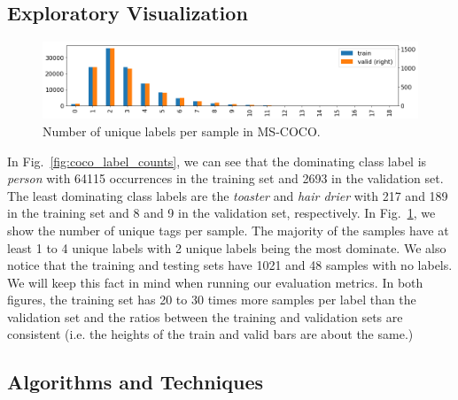 \documentclass[12pt,journal,compsoc]{IEEEtran}
\begin{document}
\subsection{Exploratory Visualization}


\begin{figure}[!t]
\normalsize
\includegraphics[width=\linewidth]{mscoco_n_images_with_k_tags.png}
\caption{Number of unique labels per sample in MS-COCO.}
\label{fig:coco_n_images_with_k_tags}
\vspace*{4pt}
\end{figure}

In Fig.~\ref{fig:coco_label_counts}, we can see that the dominating class label is \textit{person} with 64115 occurrences in the training set and 2693 in the validation set. The least dominating class labels are the \textit{toaster} and \textit{hair drier} with 217 and 189 in the training set and 8 and 9 in the validation set, respectively.
In Fig.~\ref{fig:coco_n_images_with_k_tags}, we show the number of unique tags per sample. The majority of the samples have at least 1 to 4 unique labels with 2 unique labels being the most dominate. We also notice that the training and testing sets have 1021 and 48 samples with no labels. We will keep this fact in mind when running our evaluation metrics.
In both figures, the training set has 20 to 30 times more samples per label than the validation set and the ratios between the training and validation sets are consistent (i.e. the heights of the train and valid bars are about the same.)

\subsection{Algorithms and Techniques}\label{sec:algo}
\end{document}
